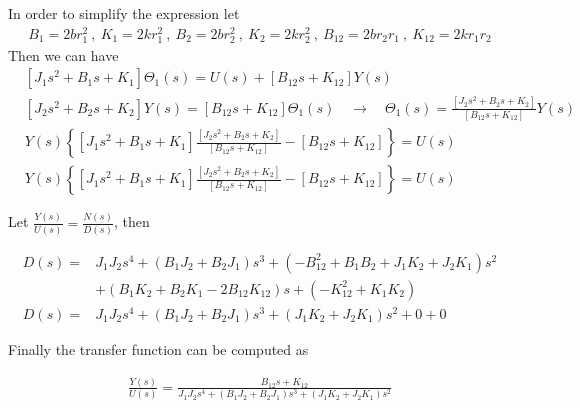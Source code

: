 \documentclass[twoside]{article}
\theoremstyle{definition}
\begin{document}
\begin{enumerate}
In order to simplify the expression let
%
\begin{align*}
B_1 = 2 b r_1^2 \ , \ K_1 = 2 k r_1^2 \ , \ B_2 =2 b r_2^2 \ , \ K_2 =
  2 k r_2^2 \ , \ B_{12} = 2 b r_2 r_1 \ , \ K_{12} = 2 k r_1 r_2
\end{align*}
%
Then we can have 
%
\begin{align*}
&\left[  J_1 s^2 + B_1 s + K_1 \right] \Theta_1(s) = U(s)
                                                                +
\left[ B_{12} s + K_{12} \right] Y(s)
\\
&\left[  J_2 s^2 +B_2 s+ K_2 \right] Y(s) = 
\left[ B_{12} s +  K_{12} \right] \Theta_1(s) \quad \rightarrow \quad 
\Theta_1(s) = \frac{\left[  J_2 s^2 +B_2 s+ K_2 \right]}{\left[
                                           B_{12} s + K_{12}
                                           \right]} Y(s)
\\
&Y(s) \left\lbrace \left[  J_1 s^2 + B_1 s + K_1 \right] \frac{\left[
  J_2 s^2 +B_2 s+ K_2 \right]}{\left[ B_{12} s + K_{12}\right]} -
  \left[ B_{12} s + K_{12} \right]\right\rbrace = U(s)
\\
&Y(s) \left\lbrace \left[  J_1 s^2 + B_1 s + K_1 \right] \frac{\left[
  J_2 s^2 +B_2 s+ K_2 \right]}{\left[ B_{12} s + K_{12}\right]} -
  \left[ B_{12} s + K_{12} \right]\right\rbrace = U(s)
\end{align*}

Let $\frac{Y(s)}{U(s)} = \frac{N(s)}{D(s)}$, then

\begin{align*}
D(s) =& J_1 J_2 s^4 + (B_1 J_2 + B_2 J_1) s^3 + (- B_{12}^2 + B_1 B_2 + J_1 K_2 +
  J_2 K_1) s^2 
\\&+ (B_1 K_2 + B_2 K_1 - 2 B_{12} K_{12}) s + ( -
  K_{12}^2 + K_1 K_2 )
\\
D(s) =&  J_1 J_2 s^4 + (B_1 J_2 + B_2 J_1) s^3 + ( J_1 K_2 + J_2 K_1)
        s^2 + 0 + 0
\end{align*}

Finally the transfer function can be computed as

\begin{align*}
\frac{Y(s)}{U(s)} = \frac{ B_{12} s + K_{12} }{ J_1 J_2 s^4 + (B_1 J_2 + B_2 J_1) s^3 + ( J_1 K_2 + J_2 K_1)
        s^2 }
\end{align*}


\end{enumerate}
\end{document}
